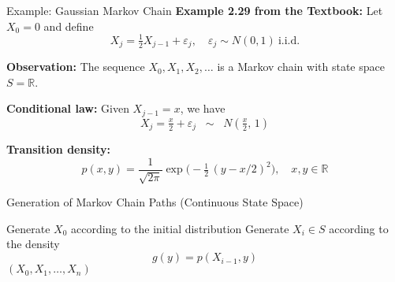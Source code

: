 \documentclass[8pt]{beamer}
\begin{document}
\begin{frame}{Example: Gaussian Markov Chain}
\textbf{Example 2.29 from the Textbook:}  
Let $X_0 = 0$ and define
\begin{equation*}
X_j = \tfrac{1}{2} X_{j-1} + \varepsilon_j, 
\quad \varepsilon_j \sim N(0,1) \ \text{i.i.d.}
\end{equation*}

\vspace{3mm}

\textbf{Observation:}  
The sequence $X_0, X_1, X_2, \ldots$ is a Markov chain with state space $S=\mathbb{R}$.

\vspace{3mm}

\textbf{Conditional law:}  
Given $X_{j-1}=x$, we have
\begin{equation*}
X_j = \tfrac{x}{2} + \varepsilon_j 
\;\;\sim\;\; N\!\left(\tfrac{x}{2},\, 1\right)
\end{equation*}

\vspace{3mm}

\textbf{Transition density:}
\begin{equation*}
p(x,y) = \frac{1}{\sqrt{2\pi}} 
\exp\!\Bigg(-\tfrac{1}{2}\,(y - x/2)^2 \Bigg),
\quad x,y \in \mathbb{R}
\end{equation*}
\end{frame}

\begin{frame}{Generation of Markov Chain Paths (Continuous State Space)}
\begin{algorithm}[H]
\caption{Simulating a Markov Chain Path}
\begin{algorithmic}[1]
\State Generate $X_0$ according to the initial distribution
    \State Generate $X_i \in S$ according to the density
    \[
    g(y) = p(X_{i-1}, y)
    \]
\EndFor
\State \Return $(X_0, X_1, \ldots, X_n)$
\end{algorithmic}
\end{algorithm}
\end{frame}
\end{document}
